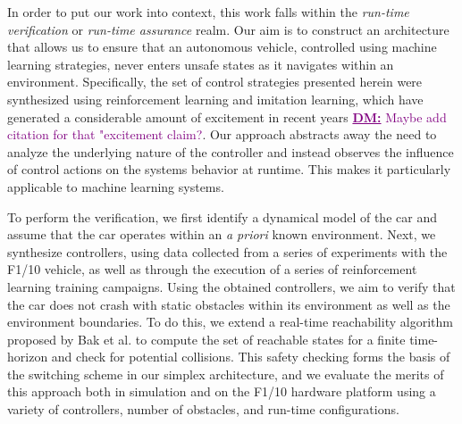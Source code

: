 \documentclass[manuscript,screen,review]{acmart}
\newcommand{\todo}[1]{\textcolor{red}{\textbf{\underline{TODO:}} #1}}
\newcommand{\diego}[1]{\textcolor{purple}{\textbf{\underline{DM:}} #1}}
\begin{document}
In order to put our work into context, this work falls within the \textit{run-time verification} or \textit{run-time assurance} realm. Our aim is to construct an architecture that allows us to ensure that an autonomous vehicle, controlled using machine learning strategies, never enters unsafe states as it navigates within an environment. Specifically, the set of control strategies presented herein were synthesized using reinforcement learning and imitation learning, which have generated a considerable amount of excitement in recent years \diego{Maybe add citation for that "excitement claim?}. Our approach abstracts away the need to analyze the underlying nature of the controller and instead observes the influence of control actions on the systems behavior at runtime. This makes it particularly applicable to machine learning systems. 

To perform the verification, we first identify a dynamical model of the car and assume that the car operates within an \textit{a priori} known environment. Next, we synthesize controllers, using data collected from a series of experiments with the F1/10 vehicle, as well as through the execution of a series of reinforcement learning training campaigns. Using the obtained controllers, we aim to verify that the car does not crash with static obstacles within its environment as well as the environment boundaries. To do this, we extend a real-time reachability algorithm proposed by Bak et al. \cite{Bak2014,Johnson2016} to compute the set of reachable states for a finite time-horizon and check for potential collisions. This safety checking forms the basis of the switching scheme in our simplex architecture, and we evaluate the merits of this approach both in simulation and on the F1/10 hardware platform using a variety of controllers, number of obstacles, and run-time configurations.
\end{document}
